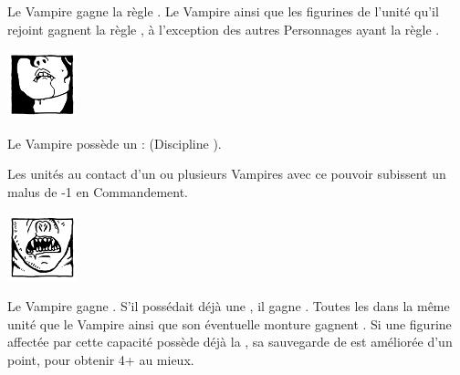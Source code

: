 \begin{multicols}{2}
 Le Vampire gagne la règle \awaken{\zombies{}, \direwolves{}, \batswarms{}, \greatbats{}}. Le Vampire ainsi que les figurines de l'unité qu'il rejoint gagnent la règle \swiftstride{}, à l'exception des autres Personnages ayant la règle \vampiric{}.

\endpricelist

\begin{center}\includegraphics[width=2cm]{pics/logo_lamia.png}\end{center}
\vspace*{-1.2cm}

\startpricelist

 Le Vampire possède un  : \lustspellfour{} (Discipline \lust{}).

 Les unités au contact d'un ou plusieurs Vampires avec ce pouvoir subissent un malus de -1 en Commandement.

\endpricelist
\columnbreak

\begin{center}\includegraphics[width=2cm]{pics/logo_strigoi.png}\end{center}
\vspace*{-1.45cm} %
\vspace*{-0.2cm} %
\startpricelist

 Le Vampire gagne . S'il possédait déjà une \regeneration{}, il gagne . Toutes les \ghouls{} dans la même unité que le Vampire ainsi que son éventuelle monture gagnent . Si une figurine affectée par cette capacité possède déjà la \regeneration{}, sa sauvegarde de \regeneration{} est améliorée d'un point, pour obtenir 4+ au mieux.


\end{multicols}
